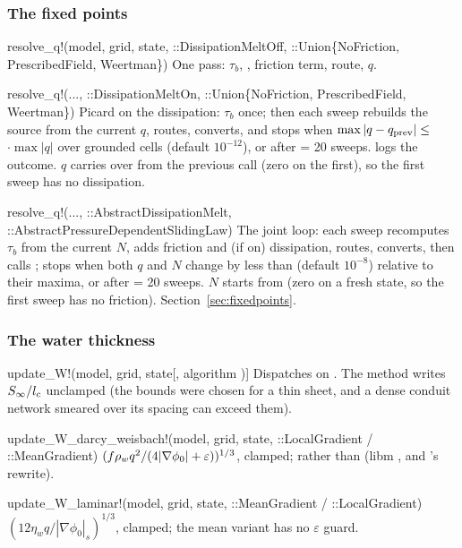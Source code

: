\subsubsection*{The fixed points}
\begin{fnlist}
\item[resolve\_q!(model, grid, state, ::DissipationMeltOff, ::Union\{NoFriction, PrescribedField, Weertman\})] One pass:
  $\tau_b$, , friction term, route, $q$.
\item[resolve\_q!(..., ::DissipationMeltOn, ::Union\{NoFriction, PrescribedField, Weertman\})] Picard on the dissipation: $\tau_b$ once;
  then each sweep rebuilds the source from the current $q$, routes, converts, and stops when
  $\max|q - q_{\rm prev}| \le$ $\cdot\max|q|$ over grounded cells (default $10^{-12}$), or after
   = 20 sweeps.  logs the outcome. $q$ carries over from the previous call
  (zero on the first), so the first sweep has no dissipation.
\item[resolve\_q!(..., ::AbstractDissipationMelt, ::AbstractPressureDependentSlidingLaw)] The joint loop: each sweep recomputes $\tau_b$
  from the current $N$, adds friction and (if on) dissipation, routes, converts, then calls ; stops when both $q$ and
  $N$ change by less than  (default $10^{-8}$) relative to their maxima, or after  = 20 sweeps.
  $N$ starts from  (zero on a fresh state, so the first sweep has no friction). Section~\ref{sec:fixedpoints}.
\end{fnlist}

\subsubsection*{The water thickness}
\begin{fnlist}
\item[update\_W!(model, grid, state[, algorithm])] Dispatches on . The
   method writes ${S_\infty}/l_c$ unclamped (the bounds were chosen for a thin sheet, and a dense conduit
  network smeared over its spacing can exceed them).
\item[update\_W\_darcy\_weisbach!(model, grid, state, ::LocalGradient / ::MeanGradient)] $(f{\rho_w} q^2/(4|\nabla\phi_0| + \varepsilon))^{1/3}$,
  clamped;  rather than  (libm , and 's  rewrite).
\item[update\_W\_laminar!(model, grid, state, ::MeanGradient / ::LocalGradient)] $(12\eta_w q/|\nabla\phi_0|_s)^{1/3}$, clamped; the mean
  variant has no $\varepsilon$ guard.
\end{fnlist}

